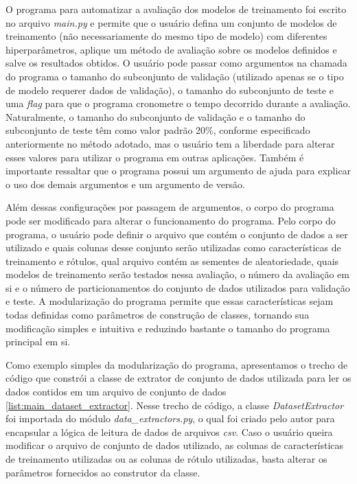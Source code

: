 O programa para automatizar a avaliação dos modelos de treinamento foi escrito no arquivo \textit{main.py} e permite que o usuário defina um conjunto de modelos de treinamento (não necessariamente do mesmo tipo de modelo) com diferentes hiperparâmetros, aplique um método de avaliação sobre os modelos definidos e salve os resultados obtidos. O usuário pode passar como argumentos na chamada do programa o tamanho do subconjunto de validação (utilizado apenas se o tipo de modelo requerer dados de validação), o tamanho do subconjunto de teste e uma \textit{flag} para que o programa cronometre o tempo decorrido durante a avaliação. Naturalmente, o tamanho do subconjunto de validação e o tamanho do subconjunto de teste têm como valor padrão 20\%, conforme especificado anteriormente no método adotado, mas o usuário tem a liberdade para alterar esses valores para utilizar o programa em outras aplicações. Também é importante ressaltar que o programa possui um argumento de ajuda para explicar o uso dos demais argumentos e um argumento de versão.

Além dessas configurações por passagem de argumentos, o corpo do programa pode ser modificado para alterar o funcionamento do programa. Pelo corpo do programa, o usuário pode definir o arquivo que contém o conjunto de dados a ser utilizado e quais colunas desse conjunto serão utilizadas como características de treinamento e rótulos, qual arquivo contém as sementes de aleatoriedade, quais modelos de treinamento serão testados nessa avaliação, o número da avaliação em si e o número de particionamentos do conjunto de dados utilizados para validação e teste. A modularização do programa permite que essas características sejam todas definidas como parâmetros de construção de classes, tornando sua modificação simples e intuitiva e reduzindo bastante o tamanho do programa principal em si.

Como exemplo simples da modularização do programa, apresentamos o trecho de código que constrói a classe de extrator de conjunto de dados utilizada para ler os dados contidos em um arquivo de conjunto de dados \ref{list:main_dataset_extractor}. Nesse trecho de código, a classe \textit{DatasetExtractor} foi importada do módulo \textit{data\_extractors.py}, o qual foi criado pelo autor para encapsular a lógica de leitura de dados de arquivos \textit{csv}. Caso o usuário queira modificar o arquivo de conjunto de dados utilizado, as colunas de características de treinamento utilizadas ou as colunas de rótulo utilizadas, basta alterar os parâmetros fornecidos ao construtor da classe.

